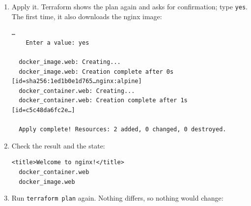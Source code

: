 \begin{enumerate}
\begin{codeblock}
\begin{Verbatim}[formatcom=\outputstyle]
  …
    # docker_container.web will be created
    + resource "docker_container" "web" {
        + name                                        = "tf-web"
  …
    # docker_image.web will be created
    + resource "docker_image" "web" {
  …
  Plan: 2 to add, 0 to change, 0 to destroy.
  \end{Verbatim}
  \end{codeblock}
\item
  Apply it. Terraform shows the plan again and asks for confirmation; type \texttt{yes}. The first time, it also downloads the nginx image:

  \begin{codeblock}

\begin{Shaded}
\begin{Highlighting}[]
\end{Highlighting}
\end{Shaded}

  \end{codeblock}

  \begin{codeblock}
  \begin{Verbatim}[formatcom=\outputstyle]
  …
    Enter a value: yes

  docker_image.web: Creating...
  docker_image.web: Creation complete after 0s [id=sha256:1ed1b0e1d765…nginx:alpine]
  docker_container.web: Creating...
  docker_container.web: Creation complete after 1s [id=c5c48da6fc2e…]

  Apply complete! Resources: 2 added, 0 changed, 0 destroyed.
  \end{Verbatim}
  \end{codeblock}
\item
  Check the result and the state:

  \begin{codeblock}

\begin{Shaded}
\begin{Highlighting}[]
 \KeywordTok{|} 
\end{Highlighting}
\end{Shaded}

  \end{codeblock}

  \begin{codeblock}
  \begin{Verbatim}[formatcom=\outputstyle]
  <title>Welcome to nginx!</title>
  docker_container.web
  docker_image.web
  \end{Verbatim}
  \end{codeblock}
\item
  Run \texttt{terraform\ plan} again. Nothing differs, so nothing would change:


\end{enumerate}
